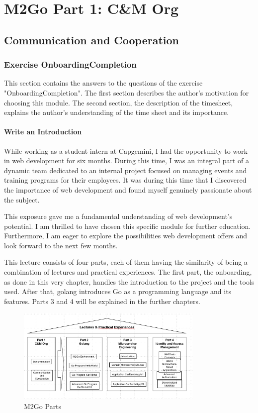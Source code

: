 \chapter{M2Go Part 1: C\&M Org}
\label{cha:cm_org}

\section{Communication and Cooperation}

\subsection{Exercise OnboardingCompletion}
\label{sec:exercise_onboarding_completion}
This section contains the answers to the questions of the exercise "OnboardingCompletion". 
The first section describes the author's motivation for choosing this module. 
The second section, the description of the timesheet, explains the author's understanding of the time sheet and its importance.

\subsubsection*{Write an Introduction}
While working as a student intern at Capgemini, I had the opportunity to work in web development for six months.
During this time, I was an integral part of a dynamic team dedicated to an internal project focused on managing events and training programs for their employees.
It was during this time that I discovered the importance of web development and found myself genuinely passionate about the subject.

This exposure gave me a fundamental understanding of web development's potential.
I am thrilled to have chosen this specific module for further education. 
Furthermore, I am eager to explore the possibilities web development offers and look forward to the next few months.

This lecture consists of four parts, each of them having the similarity of being a combination of lectures and practical experiences.
The first part, the onboarding, as done in this very chapter, handles the introduction to the project and the tools used.
After that, golang introduces Go as a programming language and its features.
Parts 3 and 4 will be explained in the further chapters.

\begin{figure}[H]
    \centering
    \includegraphics[width=0.8\textwidth]{figures/onboarding/m2go_parts.png}
    \caption{M2Go Parts}
    \label{fig:m2go_parts}
\end{figure}

